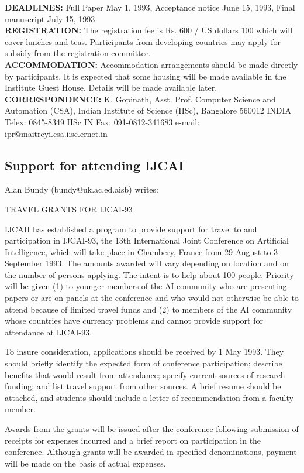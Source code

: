 {\bf DEADLINES:} 	Full Paper 		May 1, 1993,
	Acceptance notice 	June 15, 1993,
	Final manuscript	July 15, 1993\\
{\bf REGISTRATION:} The registration fee is Rs. 600 / US dollars 100 which will
cover lunches and teas. Participants from developing countries may
apply for subsidy from the registration committee.\\
{\bf ACCOMMODATION:}
Accommodation arrangements should be made directly by participants. It is 
expected that some housing will be made available in the Institute
Guest House. Details will be made available later. \\
{\bf CORRESPONDENCE:}	K. Gopinath, Asst. Prof.
	Computer Science and Automation (CSA), 
	Indian Institute of Science (IISc),
	Bangalore 560012 INDIA 
     Telex: 0845-8349 IISc IN   Fax: 091-0812-341683 
     e-mail: ipr@maitreyi.csa.iisc.ernet.in 

\subsection{Support for attending IJCAI}
Alan Bundy (bundy@uk.ac.ed.aisb) writes:

		    TRAVEL GRANTS FOR IJCAI-93

IJCAII has established a program to provide support for travel to and
participation in IJCAI-93, the 13th International Joint Conference on
Artificial Intelligence, which will take place in Chambery, France from
29 August to 3 September 1993.  The amounts awarded will vary depending
on location and on the number of persons applying.  The intent is to
help about 100 people.  Priority will be given (1) to younger members
of the AI community who are presenting papers or are on panels at the
conference and who would not otherwise be able to attend because of
limited travel funds and (2) to members of the AI community whose
countries have currency problems and cannot provide support for
attendance at IJCAI-93.

To insure consideration, applications should be received by 1 May
1993.  They should briefly identify the expected form of conference
participation; describe benefits that would result from attendance;
specify current sources of research funding; and list travel support
from other sources.  A brief resume should be attached, and students
should include a letter of recommendation from a faculty member.

Awards from the grants will be issued after the conference following
submission of receipts for expenses incurred and a brief report on
participation in the conference.  Although grants will be awarded in
specified denominations, payment will be made on the basis of actual
expenses.

